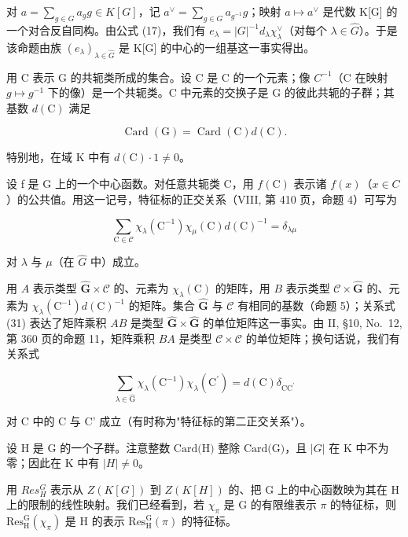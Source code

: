 对 \(a = \sum_{g \in G} a_g g \in K[G]\)，记 \(a^\vee = \sum_{g \in G} a_{g^{-1}} g\)；映射 \(a \mapsto a^\vee\) 是代数 K{[}G{]} 的一个对合反自同构。由公式 (17)，我们有 \(e_\lambda = |G|^{-1} d_\lambda \chi_\lambda^\vee\)（对每个 \(\lambda \in \widehat{G}\)）。于是该命题由族 \((e_\lambda)_{\lambda \in \widehat{G}}\) 是 K{[}G{]} 的中心的一组基这一事实得出。

用 C 表示 G 的共轭类所成的集合。设 C 是 C 的一个元素；像 \(C^{-1}\)（C 在映射 \(g \mapsto g^{-1}\) 下的像）是一个共轭类。C 中元素的交换子是 G 的彼此共轭的子群；其基数 \(d(\mathrm{C})\) 满足

\[
\operatorname{Card} (\mathrm{G}) = \operatorname{Card} (\mathrm{C}) d (\mathrm{C}).\tag{30}
\]

特别地，在域 K 中有 \(d(\mathrm{C}) \cdot 1 \neq 0\)。

设 f 是 G 上的一个中心函数。对任意共轭类 C，用 \(f(\mathrm{C})\) 表示诸 \(f(x)\)（\(x \in C\)）的公共值。用这一记号，特征标的正交关系（VIII, 第 410 页，命题 4）可写为

\[
\sum_ {\mathrm{C} \in \mathcal {C}} \chi_ {\lambda} (\mathrm{C} ^ {- 1}) \chi_ {\mu} (\mathrm{C}) d (\mathrm{C}) ^ {- 1} = \delta_ {\lambda \mu}\tag{31}
\]

对 \(\lambda\) 与 \(\mu\)（在 \(\widehat{G}\) 中）成立。

用 \(A\) 表示类型 \(\widehat{\mathbf{G}} \times \mathcal{C}\) 的、元素为 \(\chi_{\lambda}(\mathrm{C})\) 的矩阵，用 \(B\) 表示类型 \(\mathcal{C} \times \widehat{\mathbf{G}}\) 的、元素为 \(\chi_{\lambda}(\mathrm{C}^{-1}) d(\mathrm{C})^{-1}\) 的矩阵。集合 \(\widehat{\mathbf{G}}\) 与 \(\mathcal{C}\) 有相同的基数（命题 5）；关系式 (31) 表达了矩阵乘积 \(AB\) 是类型 \(\widehat{\mathbf{G}} \times \widehat{\mathbf{G}}\) 的单位矩阵这一事实。由 II, §10, No.~12, 第 360 页的命题 11，矩阵乘积 \(BA\) 是类型 \(\mathcal{C} \times \mathcal{C}\) 的单位矩阵；换句话说，我们有关系式

\[
\sum_ {\lambda \in \widehat {\mathrm{G}}} \chi_ {\lambda} (\mathrm{C} ^ {- 1}) \chi_ {\lambda} (\mathrm{C} ^ {\prime}) = d (\mathrm{C}) \delta_ {\mathrm{CC} ^ {\prime}}\tag{32}
\]

对 C 中的 C 与 C' 成立（有时称为"特征标的第二正交关系"）。

设 H 是 G 的一个子群。注意整数 \(\text{Card(H)}\) 整除 \(\text{Card(G)}\)，且 \(|G|\) 在 K 中不为零；因此在 K 中有 \(|H| \neq 0\)。

用 \(Res_{H}^{G}\) 表示从 \(Z(K[G])\) 到 \(Z(K[H])\) 的、把 G 上的中心函数映为其在 H 上的限制的线性映射。我们已经看到，若 \(\chi_{\pi}\) 是 G 的有限维表示 \(\pi\) 的特征标，则 \(\mathrm{Res}_{\mathrm{H}}^{\mathrm{G}}(\chi_{\pi})\) 是 H 的表示 \(\mathrm{Res}_{\mathrm{H}}^{\mathrm{G}}(\pi)\) 的特征标。

